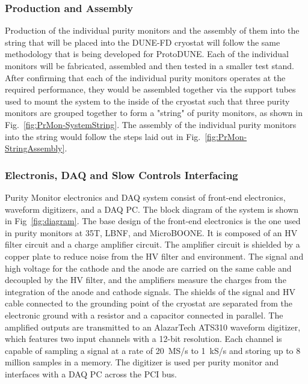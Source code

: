 \subsubsection{Production and Assembly}
\label{sec:PrMon-Production-Assembly}
Production of the individual purity monitors and the assembly of them into the string that will be placed into the DUNE-FD cryostat will follow the same methodology that is being developed for ProtoDUNE.  Each of the individual monitors will be fabricated, assembled and then tested in a smaller test stand.  After confirming that each of the individual purity monitors operates at the required performance, they would be assembled together via the support tubes used to mount the system to the inside of the cryostat such that three purity monitors are grouped together to form a "string" of purity monitors, as shown in Fig.~\ref{fig:PrMon-SystemString}.  The assembly of the individual purity monitors into the string would follow the steps laid out in Fig.~\ref{fig:PrMon-StringAssembly}.  




\subsubsection{Electronis, DAQ and Slow Controls Interfacing}

Purity Monitor electronics and DAQ system consist of front-end electronics, waveform digitizers, and a DAQ PC. The block diagram of the system is shown in Fig~\ref{fig:diagram}. The base design of the front-end electronics is the one used in purity monitors at 35T, LBNF, and MicroBOONE. It is composed of an HV filter circuit and a charge amplifier circuit. The amplifier circuit is shielded by a copper plate to reduce noise from the HV filter and environment. The signal and high voltage for the cathode and the anode are carried on the same cable and decoupled by the HV filter, and the amplifiers measure the charges from the integration of the anode and cathode signals. The shields of the signal and HV cable connected to the grounding point of the cryostat are separated from the electronic ground with a resistor and a capacitor connected in parallel. The amplified outputs are transmitted to an AlazarTech ATS310 waveform digitizer, which features two input channels with a 12-bit resolution. Each channel is capable of sampling a signal at a rate of 20~MS/s to 1~kS/s and storing up to 8 million samples in a memory. The digitizer is used per purity monitor and interfaces with a DAQ PC across the PCI bus.


